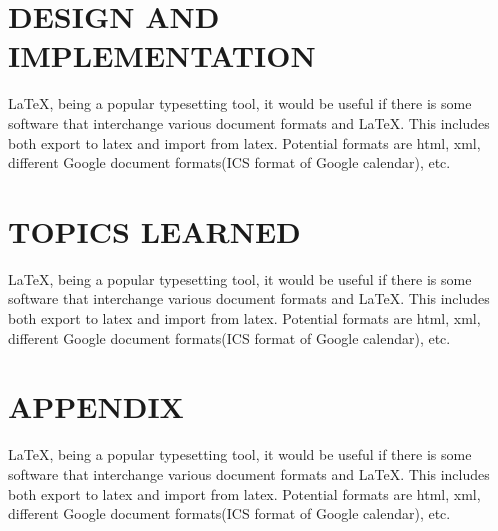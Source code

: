 \documentclass[a4paper,10pt]{mesreport}
\begin{document}
\chapter{DESIGN AND IMPLEMENTATION}

LaTeX, being a popular typesetting tool, it would be useful if there is some software that interchange
various document formats and LaTeX. This includes both export to latex and import from latex.
Potential formats are html, xml, different Google document formats(ICS format of Google calendar), etc.

\chapter{TOPICS LEARNED}
LaTeX, being a popular typesetting tool, it would be useful if there is some software that interchange
various document formats and LaTeX. This includes both export to latex and import from latex.
Potential formats are html, xml, different Google document formats(ICS format of Google calendar), etc.

\chapter{APPENDIX}
LaTeX, being a popular typesetting tool, it would be useful if there is some software that interchange
various document formats and LaTeX. This includes both export to latex and import from latex.
Potential formats are html, xml, different Google document formats(ICS format of Google calendar), etc.
\end{document}
